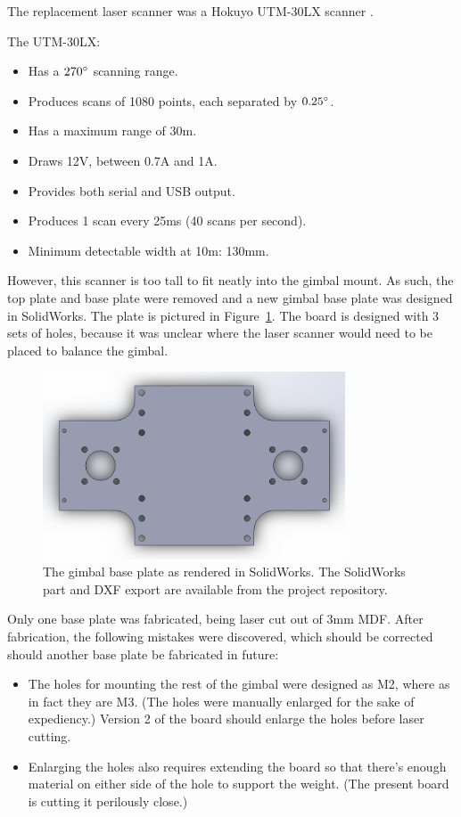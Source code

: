 \documentclass[12pt,oneside,a4paper]{book}
\begin{document}
The replacement laser scanner was a Hokuyo UTM-30LX scanner
\cite{scanner2}. 

The UTM-30LX:
\begin{itemize}
\item Has a $270\degree$ scanning range.
\item Produces scans of 1080 points, each separated by $0.25\degree$.
\item Has a maximum range of 30m.
\item Draws 12V, between 0.7A and 1A.
\item Provides both serial and USB output.
\item Produces 1 scan every 25ms (40 scans per second).
\item Minimum detectable width at 10m: 130mm.
\end{itemize}

However, this scanner is too tall to fit neatly into the gimbal
mount. As such, the top plate and base plate were removed and a new
gimbal base plate was designed in SolidWorks. The plate is pictured in
Figure~\ref{fig:baseplate}. The board is designed with 3 sets of
holes, because it was unclear where the laser scanner would need to be
placed to balance the gimbal.

\begin{figure}[h]
  \centering
  \includegraphics[width=0.8\textwidth]{figs/baseplate}
  \caption{The gimbal base plate as rendered in SolidWorks. The SolidWorks part and DXF export are available from the project repository.}
  \label{fig:baseplate}
\end{figure}

Only one base plate was fabricated, being laser cut out of 3mm
MDF. After fabrication, the following mistakes were discovered, which
should be corrected should another base plate be fabricated in future:
\begin{itemize}
\item The holes for mounting the rest of the gimbal were designed as
  M2, where as in fact they are M3. (The holes were manually enlarged
  for the sake of expediency.) Version 2 of the board should enlarge
  the holes before laser cutting.
\item Enlarging the holes also requires extending the board so that
  there's enough material on either side of the hole to support the
  weight. (The present board is cutting it perilously close.)
\end{itemize}
\end{document}
